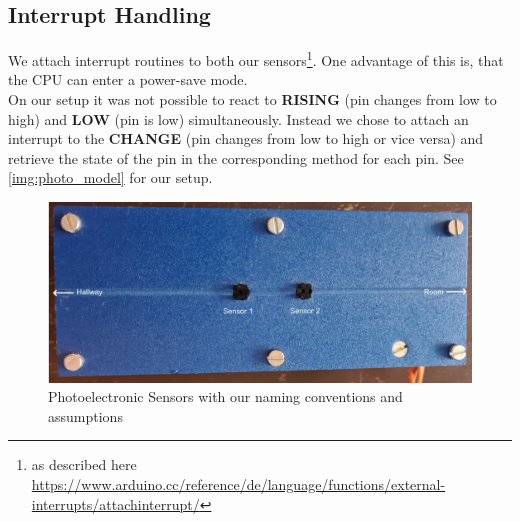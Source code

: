 \documentclass[]{article}
\begin{document}
\begin{sloppypar}
\subsection{Interrupt Handling}
We attach interrupt routines to both our sensors\footnote{as described here \url{https://www.arduino.cc/reference/de/language/functions/external-interrupts/attachinterrupt/}}. One advantage of this is, that the CPU can enter a power-save mode.\\
On our setup it was not possible to react to \textbf{RISING} (pin changes from low to high) and \textbf{LOW} (pin is low) simultaneously. Instead we chose to attach an interrupt to the \textbf{CHANGE} (pin changes from low to high or vice versa) and retrieve the state of the pin in the corresponding method for each pin. See \eqref{img:photo_model} for our setup.\\
\begin{figure}[p]
	\centering
	\includegraphics[width=\textwidth, keepaspectratio]{./images/photoelectric_model.png}
	\caption{Photoelectronic Sensors with our naming conventions and assumptions}\label{img:photo_model}
\end{figure}

\end{sloppypar}
\end{document}
